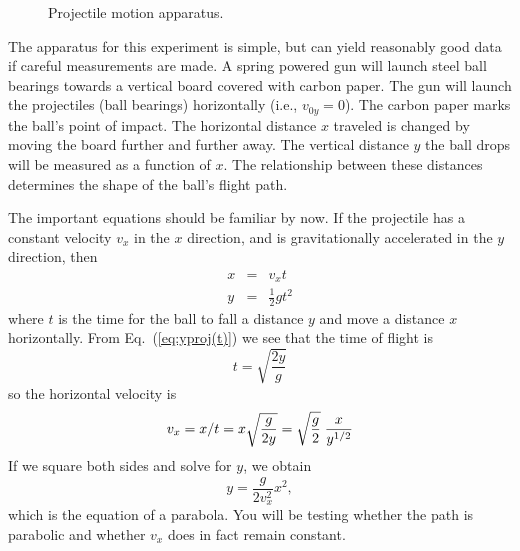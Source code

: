 \begin{figure}
\begin{center}
{}
\end{center}
 \caption{Projectile motion apparatus.  \label{fig:projectile}}
\end{figure}
The apparatus for this experiment is simple, but can yield reasonably
good data if careful measurements are made.  A spring powered gun
will launch steel ball bearings towards a
vertical board covered with carbon paper.
The gun will launch the projectiles (ball bearings) horizontally (i.e., $v_{0y}=0$).
The carbon paper marks the ball's point of impact.
The horizontal distance $x$ traveled is changed by moving the board
further and further away. The vertical distance $y$ the ball drops
will be measured as a function of $x$.  The relationship between these distances determines
the shape of the ball's flight path.

The important equations should be familiar by now.  If the projectile has a
constant velocity $v_{x}$ in the $x$ direction, and is gravitationally accelerated in
the $y$ direction, then
\begin{eqnarray}
x & \!\!= &\!\! v_{x}t \\        \label{eq:xproj(t)}
y & \!\!= &\!\! \frac{1}{2}gt^{2} \label{eq:yproj(t)}
\end{eqnarray}
where $t$ is the time for the ball to fall a distance $y$ and move
a distance $x$ horizontally.
From Eq.~(\ref{eq:yproj(t)}) we see that the time of flight is
\begin{equation}
t = \sqrt{\frac{2y}{g}}  \label{eq:t(y)}
\end{equation}
so the horizontal velocity is
\begin{equation}
v_{x} = x/t =  x\sqrt{\frac{g}{2y}} =\sqrt{\frac{g}{2}}\;{x\over y^{1/2}} \label{eq:vx}
\end{equation}
If we square both sides and solve for $y$, we obtain
\begin{equation}
y = \frac{g}{2v_{x}^{2}}x^{2}, \label{eq:y(x)}
\end{equation}
which is the equation of a parabola.  You will be testing whether 
the path is parabolic and whether 
$v_{x}$
does in fact remain constant.

